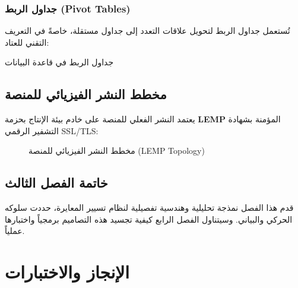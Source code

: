 \documentclass{bts-report-ar}
\begin{document}
\subsection{جداول الربط (Pivot Tables)}
تُستعمل جداول الربط لتحويل علاقات التعدد إلى جداول مستقلة، خاصةً في التعريف التقني للعتاد:

\begin{pivotar}{جداول الربط في قاعدة البيانات}
\end{pivotar}

\section{مخطط النشر الفيزيائي للمنصة}
يعتمد النشر الفعلي للمنصة على خادم بيئة الإنتاج بحزمة \textbf{LEMP} المؤمنة بشهادة التشفير الرقمي SSL/TLS:

\begin{figure}[H]
  \centering
  \begin{LTR}
  
  \end{LTR}
  \caption{مخطط النشر الفيزيائي للمنصة (LEMP Topology)}
  \label{fig:deployment}
\end{figure}

\section*{خاتمة الفصل الثالث}
قدم هذا الفصل نمذجة تحليلية وهندسية تفصيلية لنظام تسيير المعايرة، حددت سلوكه الحركي والبياني. وسيتناول الفصل الرابع كيفية تجسيد هذه التصاميم برمجياً واختبارها عملياً.


\chapter{الإنجاز والاختبارات}
\end{document}
